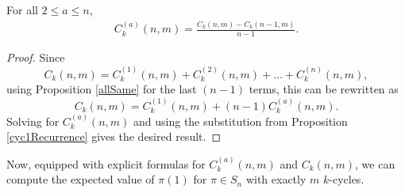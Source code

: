 \begin{lemma}
  \label{cycRecurrenceWithFixedBeginning}
  For all $2 \leq a \leq n$, \begin{align}
    C_k^{(a)}(n,m) = \frac{C_k(n, m) - C_k(n-1, m)}{n - 1}.
  \end{align}
\end{lemma}
\begin{proof}
  Since \begin{equation}
    C_k(n, m) = C_k^{(1)}(n, m) + C_k^{(2)}(n, m) + \dots + C_k^{(n)}(n, m),
  \end{equation} using Proposition \ref{allSame} for the last $(n-1)$ terms,
  this can be rewritten as \begin{equation}
    C_k(n, m) = C_k^{(1)}(n, m) + (n-1)C_k^{(a)}(n, m).
  \end{equation}
  Solving for $C_k^{(a)}(n, m)$ and using the substitution from Proposition
  \ref{cyc1Recurrence} gives the desired result.
\end{proof}
Now, equipped with explicit formulas for $C_k^{(a)}(n,m)$ and $C_k(n,m)$, we
can compute the expected value of $\pi(1)$ for $\pi \in S_n$ with exactly $m$
$k$-cycles.
